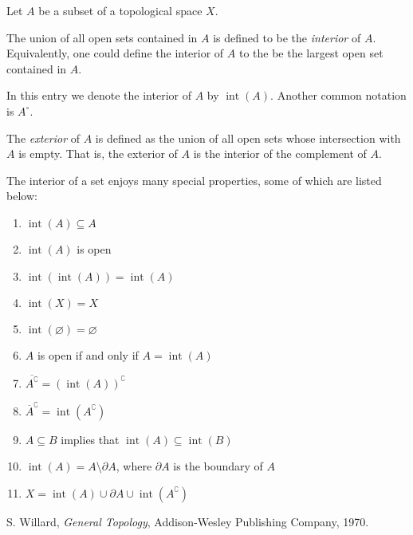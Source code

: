\documentclass[12pt]{article}
\def\int{\operatorname{int}}
\def\emptyset{\varnothing}
\begin{document}

Let $A$ be a subset of a topological space $X$.

The union of all open sets contained in $A$
is defined to be the \emph{interior} of $A$.
Equivalently, one could define the interior
of $A$ to the be the largest open set contained in $A$.

In this entry we denote the interior of $A$ by $\int(A)$.
Another common notation is $A^\circ$.

The \emph{exterior} of $A$ is defined as 
the union of all open sets whose intersection with $A$ is empty.
That is, the exterior of $A$ is the interior of the complement of $A$.

The interior of a set enjoys many special properties,
some of which are listed below:
\begin{enumerate}
\item $\int(A)\subseteq A$
\item $\int(A)$ is open
\item $\int(\int(A))=\int(A)$
\item $\int(X)=X$
\item $\int(\emptyset)=\emptyset$
\item $A$ is open if and only if $A=\int(A)$
\item $\overline{A^\complement}=(\int(A))^\complement$
\item $\overline{A}^\complement = \int(A^\complement)$
\item $A\subseteq B$ implies that $\int(A)\subseteq \int(B)$
\item $\int(A)=A\setminus \partial A$,
      where $\partial A$ is the boundary of $A$
\item $X=\int(A)\cup \partial A \cup \int(A^\complement)$
\end{enumerate}

\begin{thebibliography}{9}
 S. Willard, \emph{General Topology},
Addison-Wesley Publishing Company, 1970.
\end{thebibliography}
\end{document}
